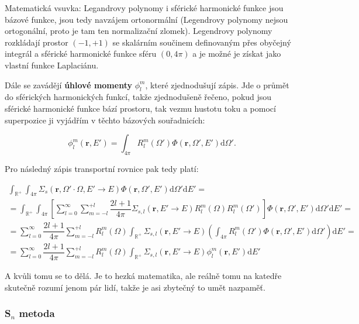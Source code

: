 Matematická vsuvka: Legandrovy polynomy i sférické harmonické funkce jsou bázové funkce, jsou tedy navzájem ortonormální (Legendrovy polynomy nejsou ortogonální, proto je tam ten normalizační zlomek). Legendrovy polynomy rozkládají prostor $(-1, +1)$ se skalárním součinem definovaným přes obyčejný integrál a sférické harmonické funkce sféru $(0, 4 \pi)$ a je možné je získat jako vlastní funkce Laplaciánu.

Dále se zavádějí \textbf{úhlové momenty} $\phi_l^m$, které zjednodušují zápis. Jde o průmět do sférických harmonických funkcí, takže zjednodušeně řečeno, pokud jsou sférické harmonické funkce bází prostoru, tak vezmu hustotu toku a pomocí superpozice ji vyjádřím v těchto bázových souřadnicích:

$$\phi_l^m(\textbf{r}, E') = \int_{4 \pi} R_l^m (\Omega') \Phi(\textbf{r}, \Omega', E') \text{d}\Omega'.$$

Pro následný zápis transportní rovnice pak tedy platí:

\begin{equation*}
  \begin{multlined}
    \int_\mathbb{R^+} \int_{4 \pi} \Sigma_s(\textbf{r}, \Omega' \cdot \Omega, E' \rightarrow E) \Phi(\textbf{r}, \Omega', E') \text{d}\Omega' \text{d}E' = \\
    = \int_\mathbb{R^+} \int_{4 \pi} \left [ \sum_{l=0}^{\infty} \sum_{m=-l}^{+l} \dfrac{2l + 1}{4 \pi} \Sigma_{s,l}(\textbf{r}, E' \rightarrow E) R_l^m(\Omega) R_l^m(\Omega') \right ] \Phi(\textbf{r}, \Omega', E') \text{d}\Omega' \text{d}E' = \\
    = \sum_{l=0}^{\infty} \dfrac{2l + 1}{4 \pi} \sum_{m=-l}^{+l} R_l^m(\Omega) \int_\mathbb{R^+} \Sigma_{s,l}(\textbf{r}, E' \rightarrow E) \left ( \int_{4 \pi} R_l^m(\Omega') \Phi(\textbf{r}, \Omega', E') \text{d}\Omega' \right ) \text{d}E' =\\
    = \sum_{l=0}^{\infty} \dfrac{2l + 1}{4 \pi} \sum_{m=-l}^{+l} R_l^m(\Omega) \int_\mathbb{R^+} \Sigma_{s,l}(\textbf{r}, E' \rightarrow E) \phi_l^m(\textbf{r}, E') \text{d}E'
  \end{multlined}
\end{equation*}

A kvůli tomu se to dělá. Je to hezká matematika, ale reálně tomu na katedře skutečně rozumí jenom pár lidí, takže je asi zbytečný to umět nazpaměť.

\subsubsection{S$_n$ metoda}

